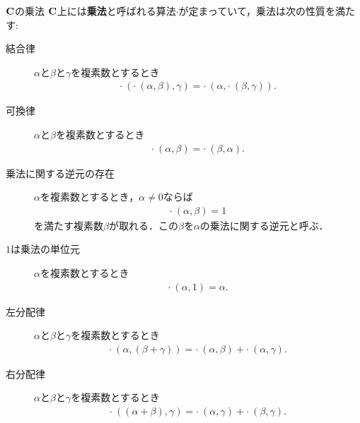 	\begin{itembox}[l]{$\mathbf{C}$の乗法}
		$\mathbf{C}$上には{\bf 乗法}と呼ばれる算法$\cdot$が定まっていて，乗法は次の性質を満たす:
		\begin{description}
			\item[結合律] $\alpha$と$\beta$と$\gamma$を複素数とするとき
				\begin{align}
					\cdot\ \left(\cdot\ (\alpha,\beta),\gamma\right) = \cdot\ \left(\alpha,\cdot\ (\beta,\gamma)\right).
				\end{align}
				
			\item[可換律]  $\alpha$と$\beta$を複素数とするとき
				\begin{align}
					\cdot\ (\alpha,\beta) = \cdot\ (\beta,\alpha).
				\end{align}
				
			\item[乗法に関する逆元の存在] $\alpha$を複素数とするとき，$\alpha \neq 0$ならば
				\begin{align}
					\cdot\ (\alpha,\beta) = 1
				\end{align}
				を満たす複素数$\beta$が取れる．この$\beta$を$\alpha$の乗法に関する逆元と呼ぶ．
				
			\item[$1$は乗法の単位元] $\alpha$を複素数とするとき
				\begin{align}
					\cdot\ (\alpha,1) = \alpha.
				\end{align}
				
			\item[左分配律] $\alpha$と$\beta$と$\gamma$を複素数とするとき
				\begin{align}
					\cdot\ \left(\alpha,(\beta + \gamma)\right) = \cdot\ (\alpha,\beta) + \cdot\ (\alpha,\gamma).
				\end{align}
				
			\item[右分配律] $\alpha$と$\beta$と$\gamma$を複素数とするとき
				\begin{align}
					\cdot\ \left((\alpha + \beta),\gamma\right) = \cdot\ (\alpha,\gamma) + \cdot\ (\beta,\gamma).
				\end{align}
		\end{description}
	\end{itembox}
	
